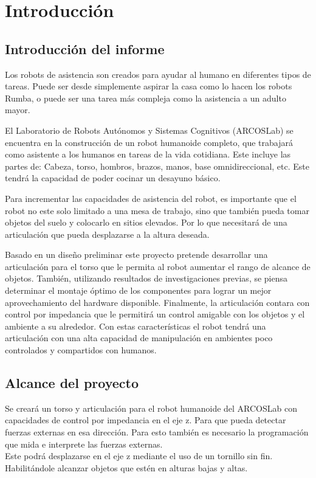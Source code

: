   \chapter{Introducción}
\label{C:introduccion}

\section{Introducción del informe}

Los robots de asistencia son creados para ayudar al humano en diferentes tipos de tareas. Puede ser desde simplemente aspirar la casa como lo hacen los robots Rumba, o puede ser una tarea más compleja como la asistencia a un adulto mayor.

El Laboratorio de Robots Autónomos y Sistemas Cognitivos (ARCOSLab) se encuentra en la construcción de un robot humanoide completo, que trabajará como asistente a los humanos en tareas de la vida cotidiana. Este incluye las partes de: Cabeza, torso, hombros, brazos, manos, base omnidireccional, etc. Este tendrá la capacidad de poder cocinar un desayuno básico. 

Para incrementar las capacidades de asistencia del robot, es importante que el robot no este solo limitado a una mesa de trabajo, sino que también pueda tomar objetos del suelo y colocarlo en sitios elevados. Por lo que necesitará de una articulación que pueda desplazarse a la altura deseada.

Basado en un diseño preliminar este proyecto pretende desarrollar una articulación para el torso que le permita al robot aumentar el rango de alcance de objetos. También, utilizando resultados de investigaciones previas, se piensa determinar el montaje óptimo de los componentes para lograr un mejor aprovechamiento del hardware disponible. Finalmente, la articulación contara con control por impedancia que le permitirá un control amigable con los objetos y el ambiente a su alrededor. Con estas características el robot tendrá una articulación con una alta capacidad de manipulación en ambientes poco controlados y compartidos con humanos.


\section{Alcance del proyecto}
Se creará un torso y articulación para el robot humanoide del ARCOSLab con capacidades de control por impedancia en el eje z. Para que pueda detectar fuerzas externas en esa dirección. Para esto también es necesario la programación que mida e interprete las fuerzas externas.\\
Este podrá desplazarse en el eje z mediante el uso de un tornillo sin fin. Habilitándole alcanzar objetos que estén en alturas bajas y altas.\\


